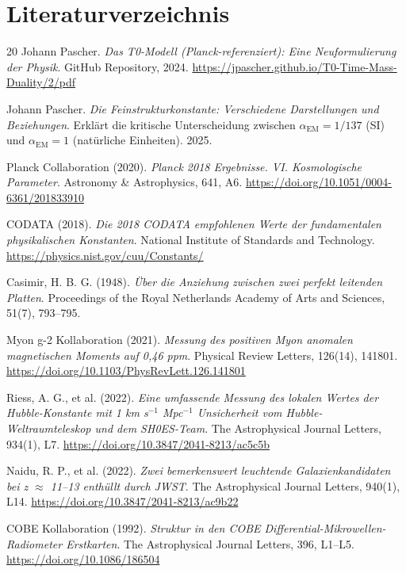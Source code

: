 \documentclass[12pt,a4paper]{article}
\begin{document}
	\section{Literaturverzeichnis}
	
	\begin{thebibliography}{20}
		Johann Pascher.
		\textit{Das T0-Modell (Planck-referenziert): Eine Neuformulierung der Physik}.
		GitHub Repository, 2024.
		\url{https://jpascher.github.io/T0-Time-Mass-Duality/2/pdf}
		
		Johann Pascher.
		\textit{Die Feinstrukturkonstante: Verschiedene Darstellungen und Beziehungen}.
		Erklärt die kritische Unterscheidung zwischen $\alpha_{\text{EM}} = 1/137$ (SI) und $\alpha_{\text{EM}} = 1$ (natürliche Einheiten).
		2025.
		
		Planck Collaboration (2020). 
		\textit{Planck 2018 Ergebnisse. VI. Kosmologische Parameter}. 
		Astronomy \& Astrophysics, 641, A6. 
		\url{https://doi.org/10.1051/0004-6361/201833910}
		
		CODATA (2018). 
		\textit{Die 2018 CODATA empfohlenen Werte der fundamentalen physikalischen Konstanten}. 
		National Institute of Standards and Technology. 
		\url{https://physics.nist.gov/cuu/Constants/}
		
		Casimir, H. B. G. (1948). 
		\textit{Über die Anziehung zwischen zwei perfekt leitenden Platten}. 
		Proceedings of the Royal Netherlands Academy of Arts and Sciences, 51(7), 793--795.
		
		Myon g-2 Kollaboration (2021). 
		\textit{Messung des positiven Myon anomalen magnetischen Moments auf 0,46 ppm}. 
		Physical Review Letters, 126(14), 141801. 
		\url{https://doi.org/10.1103/PhysRevLett.126.141801}
		
		Riess, A. G., et al. (2022). 
		\textit{Eine umfassende Messung des lokalen Wertes der Hubble-Konstante mit 1 km s$^{-1}$ Mpc$^{-1}$ Unsicherheit vom Hubble-Weltraumteleskop und dem SH0ES-Team}. 
		The Astrophysical Journal Letters, 934(1), L7. 
		\url{https://doi.org/10.3847/2041-8213/ac5c5b}
		
		Naidu, R. P., et al. (2022). 
		\textit{Zwei bemerkenswert leuchtende Galaxienkandidaten bei z $\approx$ 11--13 enthüllt durch JWST}. 
		The Astrophysical Journal Letters, 940(1), L14. 
		\url{https://doi.org/10.3847/2041-8213/ac9b22}
		
		COBE Kollaboration (1992). 
		\textit{Struktur in den COBE Differential-Mikrowellen-Radiometer Erstkarten}. 
		The Astrophysical Journal Letters, 396, L1--L5. 
		\url{https://doi.org/10.1086/186504}
	\end{thebibliography}
	
\end{document}
